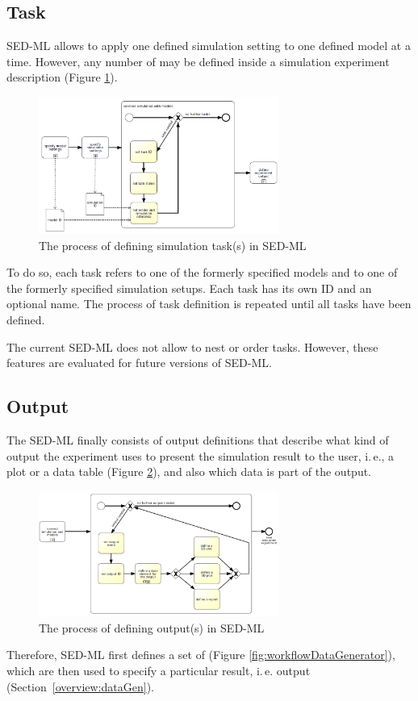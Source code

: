 \subsection{Task}
\label{overview:task}
SED-ML allows to apply one defined simulation setting to one defined model at a time. However, any number of  may be defined inside a simulation experiment description (Figure \ref{fig:workflowTask}). 
%
\begin{figure}[h]
\centering
\includegraphics[width=0.7\textwidth]{images/bpmn/sedTaskOryx.png}
\caption{The process of defining simulation task(s) in SED-ML}
\label{fig:workflowTask}
\end{figure}
%
To do so, each task refers to one of the formerly specified models and to one of the formerly specified simulation setups. Each task has its own ID and an optional name. The process of task definition is repeated until all tasks have been defined.


The current SED-ML does not allow to nest or order tasks. However, these features are evaluated for future versions of SED-ML.

\subsection{Output}
\label{overview:output}
The SED-ML finally consists of output definitions that describe what kind of output the experiment uses to present the simulation result to the user, i.\,e., a plot or a data table (Figure \ref{fig:workflowOutput}), and also which data is part of the output. 
%
\begin{figure}[h]
\centering
\includegraphics[width=0.7\textwidth]{images/bpmn/sedOutputOryx.png}
\caption{The process of defining output(s) in SED-ML}
\label{fig:workflowOutput}
\end{figure}
%
Therefore, SED-ML first defines a set of  (Figure \ref{fig:workflowDataGenerator}), which are then used to specify a particular result, i.\,e. output (Section~\ref{overview:dataGen}). 

